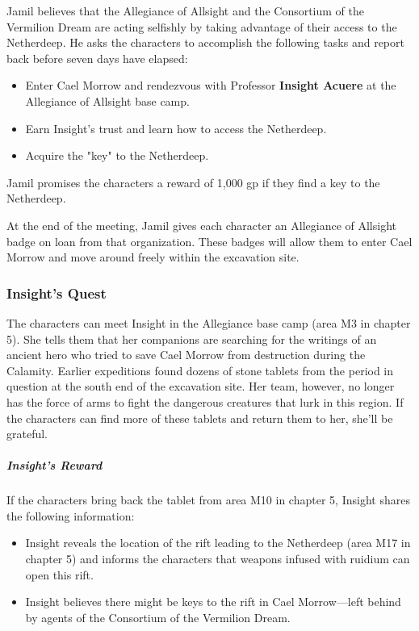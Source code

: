 \documentclass[10pt,a4paper,twoside,bg=print,twocolumn,openany,nodeprecatedcode]{dndbook}
\begin{document}
Jamil believes that the Allegiance of Allsight and the Consortium of the Vermilion Dream are acting selfishly by taking advantage of their access to the Netherdeep. He asks the characters to accomplish the following tasks and report back before seven days have elapsed:


\begin{itemize}
\item Enter Cael Morrow and rendezvous with Professor \textbf{Insight Acuere} at the Allegiance of Allsight base camp.
\item Earn Insight's trust and learn how to access the Netherdeep.
\item Acquire the "key" to the Netherdeep.
\end{itemize}

Jamil promises the characters a reward of 1,000 gp if they find a key to the Netherdeep.

At the end of the meeting, Jamil gives each character an Allegiance of Allsight badge on loan from that organization. These badges will allow them to enter Cael Morrow and move around freely within the excavation site.

\subsubsection{Insight's Quest}
The characters can meet Insight in the Allegiance base camp (area M3 in chapter 5). She tells them that her companions are searching for the writings of an ancient hero who tried to save Cael Morrow from destruction during the Calamity. Earlier expeditions found dozens of stone tablets from the period in question at the south end of the excavation site. Her team, however, no longer has the force of arms to fight the dangerous creatures that lurk in this region. If the characters can find more of these tablets and return them to her, she'll be grateful.

\subparagraph{Insight's Reward}
If the characters bring back the tablet from area M10 in chapter 5, Insight shares the following information:


\begin{itemize}
\item Insight reveals the location of the rift leading to the Netherdeep (area M17 in chapter 5) and informs the characters that weapons infused with ruidium can open this rift.
\item Insight believes there might be keys to the rift in Cael Morrow—left behind by agents of the Consortium of the Vermilion Dream.
\end{itemize}
\end{document}
